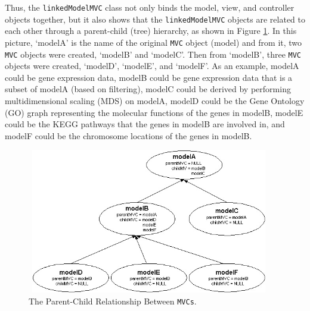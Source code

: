 \documentclass[11pt]{article}
\newcommand{\Robject}[1]{{\texttt{#1}}}
\newcommand{\Rclass}[1]{\texttt{#1}}
\begin{document}

Thus, the \Rclass{linkedModelMVC} class not only binds the model,
view, and controller objects together, but it also shows
that the \Robject{linkedModelMVC} objects are related to each other through a
parent-child (tree) hierarchy, as shown in Figure \ref{Fig:Hier}.  In this
picture, `modelA' is the name of the original \Robject{MVC} object
(model) and from it, two \Robject{MVC} objects were created,
`modelB' and `modelC'. Then from `modelB', three
\Robject{MVC} objects were created, `modelD', `modelE', and
`modelF'.  As an example, modelA could be gene 
expression data, modelB could be gene expression data that is a subset of
modelA (based on filtering), modelC could be derived by performing
multidimensional scaling (MDS) on modelA, modelD could be the Gene Ontology
(GO) graph representing the molecular functions of the genes in modelB,
modelE could be the KEGG pathways that the genes in modelB are involved
in, and modelF could be the chromosome locations of the genes in modelB.


\begin{figure}[ht]
  \begin{center}
    \includegraphics[height=2.5in, width=4.2in]{Hierarchy2.jpg}
    \caption{ The Parent-Child Relationship Between \Robject{MVCs}. }
    \label{Fig:Hier}
  \end{center}
\end{figure}
\end{document}
